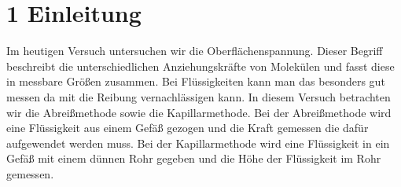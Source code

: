 \chapter*{1 Einleitung}
\setcounter{chapter}{1}
\setcounter{section}{0}
\setcounter{subsection}{0}

Im heutigen Versuch untersuchen wir die Oberflächenspannung. Dieser Begriff beschreibt die unterschiedlichen Anziehungskräfte von Molekülen und fasst diese in messbare Größen zusammen. Bei Flüssigkeiten kann man das besonders gut messen da mit die Reibung vernachlässigen kann. In diesem Versuch betrachten wir die Abreißmethode sowie die Kapillarmethode. Bei der Abreißmethode wird eine Flüssigkeit aus einem Gefäß gezogen und die Kraft gemessen die dafür aufgewendet werden muss. Bei der Kapillarmethode wird eine Flüssigkeit in ein Gefäß mit einem dünnen Rohr gegeben und die Höhe der Flüssigkeit im Rohr gemessen.